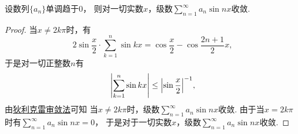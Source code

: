 \begin{example}
设数列\(\{a_n\}\)单调趋于\(0\)，
则对一切实数\(x\)，级数\(\sum_{n=1}^\infty a_n \sin n x\)收敛.
\begin{proof}
当\(x\neq2k\pi\)时，有\[
	2\sin\frac{x}{2} \cdot \sum_{k=1}^n \sin kx
	= \cos\frac{x}{2} - \cos\frac{2n+1}{2}x,
\]
于是对一切正整数\(n\)有\[
	\abs{\sum_{k=1}^n \sin k x}
	\leq \abs{\sin\frac{x}{2}}^{-1},
\]
由\hyperref[theorem:无穷级数.无穷级数的阿贝尔--狄利克雷审敛法]{狄利克雷审敛法}可知
当\(x\neq2k\pi\)时，级数\(\sum_{n=1}^\infty a_n \sin n x\)收敛.
由于当\(x=2k\pi\)时有\(\sum_{n=1}^\infty a_n \sin n x = 0\)，
于是对于一切实数\(x\)，级数\(\sum_{n=1}^\infty a_n \sin n x\)收敛.
\end{proof}
\end{example}
